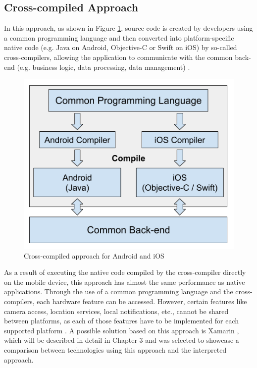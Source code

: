 \documentclass[Bachelor,BIF,english]{twbook}
\begin{document}
\subsection{Cross-compiled Approach}
In this approach, as shown in Figure \ref{Fig1}, source code is created by developers using a common programming language and then converted into platform-specific native code (e.g. Java on Android, Objective-C or Swift on iOS) by so-called cross-compilers, allowing the application to communicate with the common back-end (e.g. business logic, data processing, data management) \cite[p.~3]{7479278} \cite[p.~3]{7934674}.
\begin{figure}[!htbp]
\centering
\includegraphics[width=0.5\linewidth]{PICs/Cross-Compiled.png}
\caption{Cross-compiled approach for Android and iOS \cite[p.~3]{7479278}}\label{Fig1}
\end{figure}
As a result of executing the native code compiled by the cross-compiler directly on the mobile device, this approach has almost the same performance as native applications. Through the use of a common programming language and the cross-compilers, each hardware feature can be accessed. However, certain features like camera access, location services, local notifications, etc., cannot be shared between platforms, as each of those features have to be implemented for each supported platform \cite[p.~627]{6420693} \cite[p.~3-4]{7479278}. A possible solution based on this approach is Xamarin \cite[p.~3]{7934674}, which will be described in detail in Chapter 3 and was selected to showcase a comparison between technologies using this approach and the interpreted approach.
\end{document}
